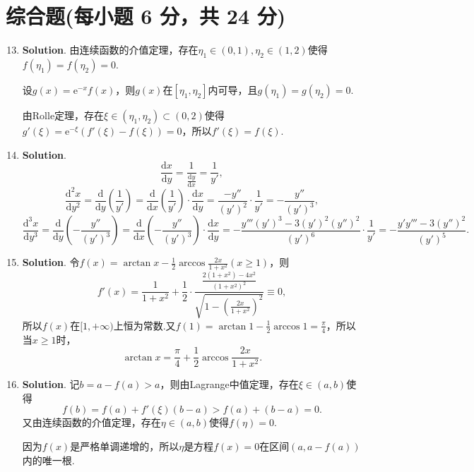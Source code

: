 \documentclass[../main.tex]{subfiles}
\begin{document}
\section{综合题(每小题 6 分，共 24 分)}
\begin{enumerate}
    \setcounter{enumi}{12}
    \item \textbf{Solution}. 由连续函数的介值定理，存在$\eta_{1}\in(0,1),\eta
              _{2}\in(1,2)$使得$f(\eta_{1})=f(\eta_{2})=0$.

          设$g(x)=\mathrm{e}^{-x}f(x)$，则$g(x)$在$[\eta_{1},\eta_{2}]$内可导，且$g(\eta
              _{1})=g(\eta_{2})=0$.

          由Rolle定理，存在$\xi\in(\eta_{1},\eta_{2})\subset(0,2)$使得$g'(\xi)=\mathrm{e}
              ^{-\xi}(f'(\xi)-f(\xi))=0$，所以$f'(\xi)=f(\xi)$.

    \item \textbf{Solution}.
          \[
              \frac{\mathrm{d}x}{\mathrm{d}y}=\frac{1}{\frac{\mathrm{d}y}{\mathrm{d}x}}
              =\frac{1}{y'},
          \]
          \[
              \frac{\mathrm{d}^{2} x}{\mathrm{d}y^{2}}=\frac{\mathrm{d}}{\mathrm{d}y}\left
              (\frac{1}{y'}\right)=\frac{\mathrm{d}}{\mathrm{d}x}\left(\frac{1}{y'}\right
              )\cdot\frac{\mathrm{d}x}{\mathrm{d}y}=\frac{-y''}{(y')^{2}}\cdot\frac{1}{y'}
              =-\frac{y''}{(y')^{3}},
          \]
          \[
              \frac{\mathrm{d}^{3} x}{\mathrm{d}y^{3}}=\frac{\mathrm{d}}{\mathrm{d}y}\left
              (-\frac{y''}{(y')^{3}}\right)=\frac{\mathrm{d}}{\mathrm{d}x}\left(-\frac{y''}{(y')^{3}}
              \right)\cdot\frac{\mathrm{d}x}{\mathrm{d}y}=-\frac{y'''(y')^{3}-3(y')^{2} (y'')^{2}}{(y')^{6}}
              \cdot\frac{1}{y'}=-\frac{y'y'''-3(y'')^{2}}{(y')^{5}}.
          \]

    \item \textbf{Solution}. 令$f(x)=\arctan x-\frac{1}{2}\arccos\frac{2x}{1+x^{2}}
              (x\geq1)$，则
          \[
              f'(x)=\frac{1}{1+x^{2}}+\frac{1}{2}\cdot\frac{\frac{2(1+x^{2})-4x^{2}}{(1+x^{2})^{2}}}{\sqrt{1-\left(\frac{2x}{1+x^2}\right)^{2}}}
              \equiv0,
          \]
          所以$f(x)$在$[1,+\infty)$上恒为常数.又$f(1)=\arctan 1-\frac{1}{2}\arccos 1=\frac{\pi}{4}$，所以当$x\geq1$时，
          \[
              \arctan x=\frac{\pi}{4}+\frac{1}{2}\arccos\frac{2x}{1+x^{2}}.
          \]

    \item \textbf{Solution}. 记$b=a-f(a)>a$，则由Lagrange中值定理，存在$\xi\in
              (a,b)$使得
          \[
              f(b)=f(a)+f'(\xi)(b-a)>f(a)+(b-a)=0.
          \]
          又由连续函数的介值定理，存在$\eta\in(a,b)$使得$f(\eta)=0$.

          因为$f(x)$是严格单调递增的，所以$\eta$是方程$f(x)=0$在区间$(a,a-f(a))$内的唯一根.
\end{enumerate}
\end{document}
